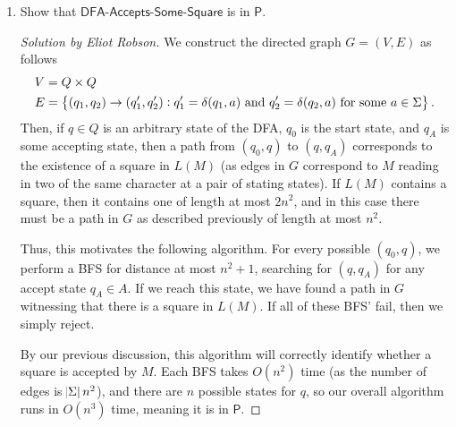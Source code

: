 \documentclass{article}
\newenvironment{solution}[1]{\begin{proof}[Solution by #1]}{\end{proof}}
\newcommand{\Pe}{\mathsf{P}}
\begin{document}
\begin{enumerate}
    \item Show that \(\textsf{DFA-Accepts-Some-Square}\) is in \(\Pe\).
    
    \begin{solution}{Eliot Robson}
        We construct the directed graph \(G = (V,E)\) as follows
        \begin{align*}
            V &= Q \times Q\\
            E &= \set{(q_1, q_2) \to (q_1', q_2') :
                q_1' = \delta(q_1, a) \text{ and } q_2' = \delta(q_2, a) \text{ for some } a \in \Sigma}.
        \end{align*}
        Then, if \(q \in Q\) is an arbitrary state of the DFA, \(q_0\) is the start state, and \(q_A\) is some accepting state, then a path from \((q_0, q)\) to \((q, q_A)\) corresponds to the existence of a square in \(L(M)\) (as edges in \(G\) correspond to \(M\) reading in two of the same character at a pair of stating states). If \(L(M)\) contains a square, then it contains one of length at most \(2n^2\), and in this case there must be a path in \(G\) as described previously of length at most \(n^2\).
        
        Thus, this motivates the following algorithm. For every possible \((q_0, q)\), we perform a BFS for distance at most \(n^2+1\), searching for \((q, q_A)\) for any accept state \(q_A \in A\). If we reach this state, we have found a path in \(G\) witnessing that there is a square in \(L(M)\). If all of these BFS' fail, then we simply reject.
        
        By our previous discussion, this algorithm will correctly identify whether a square is accepted by \(M\). Each BFS takes \(O(n^2)\) time (as the number of edges is \(\abs{\Sigma} n^2\)), and there are \(n\) possible states for \(q\), so our overall algorithm runs in \(O(n^3)\) time, meaning it is in \(\Pe\).
    \end{solution}
    
\end{enumerate}

\end{document}
